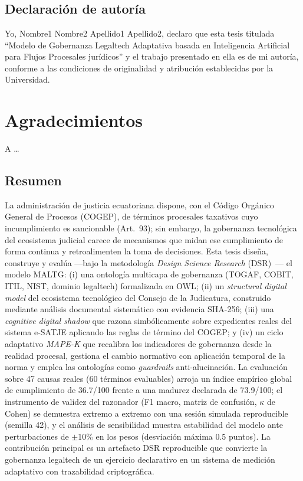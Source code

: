 \documentclass[a4paper,openany,12pt]{book}
\begin{document}
\chapter*{}
\section*{Declaración de autoría}
Yo, Nombre1 Nombre2 Apellido1 Apellido2, declaro que esta tesis titulada ``Modelo de Gobernanza Legaltech Adaptativa basada en Inteligencia Artificial para Flujos Procesales jurídicos'' y el trabajo presentado en ella es de mi autoría, conforme a las condiciones de originalidad y atribución establecidas por la Universidad.
\cleardoublepage

\chapter*{Agradecimientos}
A \ldots
\cleardoublepage

\section*{Resumen}
La administración de justicia ecuatoriana dispone, con el Código Orgánico General de Procesos (COGEP), de términos procesales taxativos cuyo incumplimiento es sancionable (Art.~93); sin embargo, la gobernanza tecnológica del ecosistema judicial carece de mecanismos que midan ese cumplimiento de forma continua y retroalimenten la toma de decisiones. Esta tesis diseña, construye y evalúa ---bajo la metodología \textit{Design Science Research} (DSR)~\cite{hevner2004,peffers2007}--- el modelo MALTG: (i) una ontología multicapa de gobernanza (TOGAF, COBIT, ITIL, NIST, dominio legaltech) formalizada en OWL; (ii) un \textit{structural digital model} del ecosistema tecnológico del Consejo de la Judicatura, construido mediante análisis documental sistemático con evidencia SHA-256; (iii) una \textit{cognitive digital shadow} que razona simbólicamente sobre expedientes reales del sistema e-SATJE aplicando las reglas de término del COGEP; y (iv) un ciclo adaptativo \textit{MAPE-K} que recalibra los indicadores de gobernanza desde la realidad procesal, gestiona el cambio normativo con aplicación temporal de la norma y emplea las ontologías como \textit{guardrails} anti-alucinación. La evaluación sobre 47 causas reales (60 términos evaluables) arroja un índice empírico global de cumplimiento de 36.7/100 frente a una madurez declarada de 73.9/100; el instrumento de validez del razonador (F1 macro, matriz de confusión, $\kappa$ de Cohen) se demuestra extremo a extremo con una sesión simulada reproducible (semilla 42), y el análisis de sensibilidad muestra estabilidad del modelo ante perturbaciones de $\pm$10\% en los pesos (desviación máxima 0.5 puntos). La contribución principal es un artefacto DSR reproducible que convierte la gobernanza legaltech de un ejercicio declarativo en un sistema de medición adaptativo con trazabilidad criptográfica.
\end{document}
